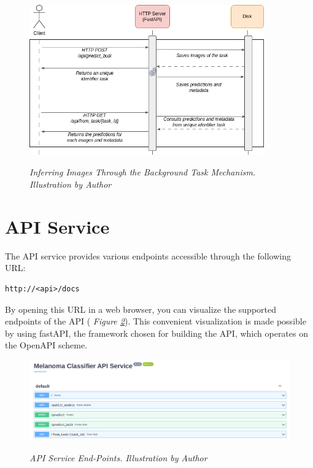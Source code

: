 \begin{figure}[H]
\centering
\includegraphics[width=0.9\textwidth]{imatges/preliminaries/BackgroundTask.drawio.png}
\caption[Inferring Images Through the Background Task Mechanism]{\textit{Inferring Images Through the Background Task Mechanism.  Illustration by Author}}
{\label{fig:backgrond-task}}
\end{figure}

\newpage

\section{API Service}

The API service provides various endpoints accessible through the following URL:

\begin{Verbatim}[fontsize=\scriptsize]
http://<api>/docs
\end{Verbatim}

By opening this URL in a web browser, you can visualize the supported endpoints of the API
( \textit{Figure \ref{fig:api-endpoints}}). This convenient visualization is made possible by using fastAPI,
the framework chosen for building the API, which operates on the OpenAPI scheme.

\begin{figure}[H]
\centering
\begin{adjustbox}{width=\textwidth, trim={0.2cm 0cm 0.1cm 0cm}, clip}
    \includegraphics[width=\textwidth]{imatges/results/api-endpoints.png}
\end{adjustbox}
\caption[API Service End-Points]{\textit{API Service End-Points. Illustration by Author}}
{\label{fig:api-endpoints}}
\end{figure}

